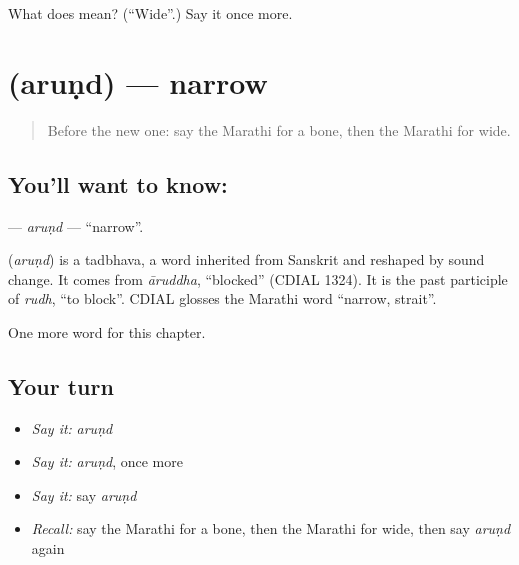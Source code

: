 \begin{tcolorbox}[breakable,colback=teal!4,colframe=teal!35!black,title={Before you move on}]
What does  mean? (\textquotedblleft{}Wide\textquotedblright{}.) Say it once more.
\end{tcolorbox}
\section[\texorpdfstring{\mr{अरुंद} (aruṇd)}{अरुंद (aruṇd)}]{ (aruṇd) — narrow}

\label{lesson:MR-C147-arund}



\begin{quote}
Before the new one: say the Marathi for a bone, then the Marathi for wide.
\end{quote}

\subsection*{You'll want to know: }
\textbf{} — \emph{aruṇd} — \textquotedblleft{}narrow\textquotedblright{}.

\begin{cousinweb}
\textbf{} (\emph{aruṇd}) is a tadbhava, a word inherited from Sanskrit and reshaped by sound change. It comes from \emph{āruddha}, \textquotedblleft{}blocked\textquotedblright{} (CDIAL 1324). It is the past participle of \emph{rudh}, \textquotedblleft{}to block\textquotedblright{}. CDIAL glosses the Marathi word \textquotedblleft{}narrow, strait\textquotedblright{}.
\end{cousinweb}

\begin{grammarlens}[title={What you've built}]
One more word for this chapter.
\end{grammarlens}

\subsection*{Your turn}
\begin{itemize}
\raggedright
  \item \emph{Say it:} \emph{aruṇd}
  \item \emph{Say it:} \emph{aruṇd}, once more
  \item \emph{Say it:} say \emph{aruṇd}
  \item \emph{Recall:} say the Marathi for a bone, then the Marathi for wide, then say \emph{aruṇd} again
\end{itemize}

